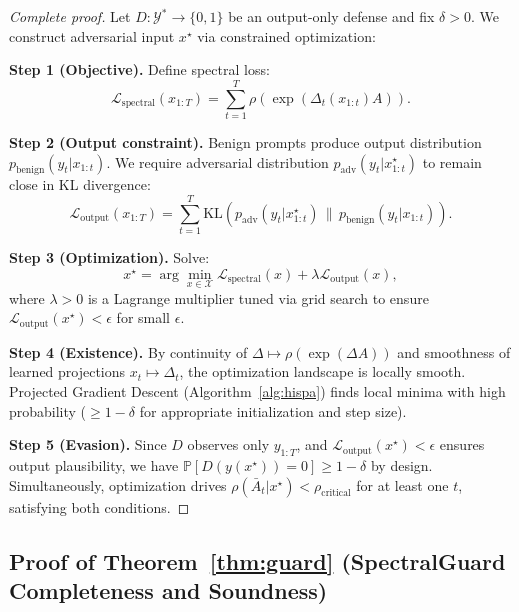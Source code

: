\documentclass[10pt,twocolumn]{article}
\begin{document}
\begin{proof}[Complete proof]
Let $D: \mathcal{Y}^* \to \{0,1\}$ be an output-only defense and fix $\delta > 0$. We construct adversarial input $x^\star$ via constrained optimization:

\textbf{Step 1 (Objective).} Define spectral loss:
\begin{equation}
\mathcal{L}_{\text{spectral}}(x_{1:T}) = \sum_{t=1}^{T} \rho\left(\exp(\Delta_t(x_{1:t}) A)\right).
\end{equation}

\textbf{Step 2 (Output constraint).} Benign prompts produce output distribution $p_{\text{benign}}(y_t | x_{1:t})$. We require adversarial distribution $p_{\text{adv}}(y_t | x^\star_{1:t})$ to remain close in KL divergence:
\begin{equation}
\mathcal{L}_{\text{output}}(x_{1:T}) = \sum_{t=1}^{T} \text{KL}\left(p_{\text{adv}}(y_t | x^\star_{1:t}) \,\|\, p_{\text{benign}}(y_t | x_{1:t})\right).
\end{equation}

\textbf{Step 3 (Optimization).} Solve:
\begin{equation}
x^\star = \arg\min_{x \in \mathcal{X}} \mathcal{L}_{\text{spectral}}(x) + \lambda \mathcal{L}_{\text{output}}(x),
\end{equation}
where $\lambda > 0$ is a Lagrange multiplier tuned via grid search to ensure $\mathcal{L}_{\text{output}}(x^\star) < \epsilon$ for small $\epsilon$.

\textbf{Step 4 (Existence).} By continuity of $\Delta \mapsto \rho(\exp(\Delta A))$ and smoothness of learned projections $x_t \mapsto \Delta_t$, the optimization landscape is locally smooth. Projected Gradient Descent (Algorithm~\ref{alg:hispa}) finds local minima with high probability ($\ge 1 - \delta$ for appropriate initialization and step size).

\textbf{Step 5 (Evasion).} Since $D$ observes only $y_{1:T}$, and $\mathcal{L}_{\text{output}}(x^\star) < \epsilon$ ensures output plausibility, we have $\mathbb{P}[D(y(x^\star)) = 0] \ge 1 - \delta$ by design. Simultaneously, optimization drives $\rho(\bar{A}_t | x^\star) < \rho_{\text{critical}}$ for at least one $t$, satisfying both conditions.
\end{proof}

\subsection{Proof of Theorem~\ref{thm:guard} (SpectralGuard Completeness and Soundness)}
\label{proof:guard}
\end{document}
